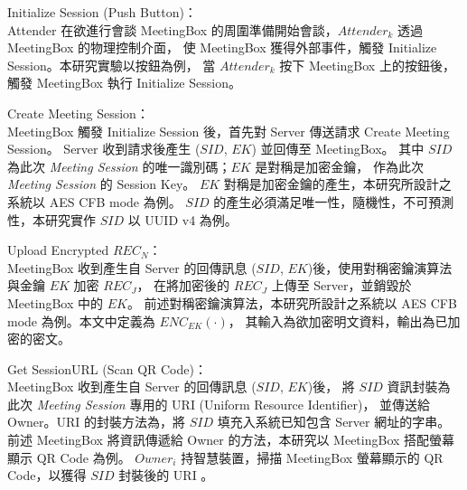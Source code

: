 \begin{steps}
    \item Initialize Session (Push Button)：\\
        Attender 在欲進行會談 MeetingBox 的周圍準備開始會談，$Attender_{k}$ 透過 MeetingBox 的物理控制介面，
        使 MeetingBox 獲得外部事件，觸發 Initialize Session。本研究實驗以按鈕為例，
        當 $Attender_{k}$ 按下 MeetingBox 上的按鈕後，觸發 MeetingBox 執行 Initialize Session。

    \item Create Meeting Session：\\
        MeetingBox 觸發 Initialize Session 後，首先對 Server 傳送請求 Create Meeting Session。
        Server 收到請求後產生 ($SID$, $EK$) 並回傳至 MeetingBox。
        其中 $SID$ 為此次 {\it Meeting Session} 的唯一識別碼；$EK$ 是對稱是加密金鑰，
        作為此次 {\it Meeting Session} 的 Session Key。
        $EK$ 對稱是加密金鑰的產生，本研究所設計之系統以 AES CFB mode 為例。
        $SID$ 的產生必須滿足唯一性，隨機性，不可預測性，本研究實作 $SID$ 以 UUID v4 為例。

    \item Upload Encrypted $REC_{N}$：\\
        MeetingBox 收到產生自 Server 的回傳訊息 ($SID$, $EK$)後，使用對稱密鑰演算法與金鑰 $EK$ 加密 $REC_{J}$，
        在將加密後的 $REC_{J}$ 上傳至 Server，並銷毀於 MeetingBox 中的 $EK$。
        前述對稱密鑰演算法，本研究所設計之系統以 AES CFB mode 為例。本文中定義為 $ENC_{EK}(·)$，
        其輸入為欲加密明文資料，輸出為已加密的密文。

    \item Get SessionURL (Scan QR Code)：\\
        MeetingBox 收到產生自 Server 的回傳訊息 ($SID$, $EK$)後，
        將 $SID$ 資訊封裝為此次 {\it Meeting Session} 專用的 URI (Uniform Resource Identifier)，
        並傳送給 Owner。URI 的封裝方法為，將 $SID$ 填充入系統已知包含 Server 網址的字串。
        前述 MeetingBox 將資訊傳遞給 Owner 的方法，本研究以 MeetingBox 搭配螢幕顯示 QR Code 為例。
        $Owner_{i}$ 持智慧裝置，掃描 MeetingBox 螢幕顯示的 QR Code，以獲得 $SID$ 封裝後的 URI 。


\end{steps}

